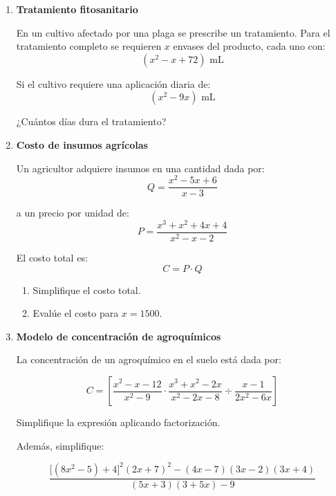 \documentclass[12pt]{article}
\begin{document}
\begin{enumerate}
		Para mejorar el rendimiento de un cultivo se deben fertilizar:
		\[
		(3n^2+5n)
		\]
		plantas y la dosis a aplicar a cada una es de
		\[
		(2n+7)\text{ mL}.
		\]
		
		Determine la cantidad total de fertilizante (en mL) que se debe aplicar.
		
		\item \textbf{Tratamiento fitosanitario}
		
		En un cultivo afectado por una plaga se prescribe un tratamiento. Para el tratamiento completo se requieren \(x\) envases del producto, cada uno con:
		\[
		(x^2-x+72)\text{ mL}
		\]
		
		Si el cultivo requiere una aplicación diaria de:
		\[
		(x^2-9x)\text{ mL}
		\]
		
		¿Cuántos días dura el tratamiento?
		
		\item \textbf{Costo de insumos agrícolas}
		
		Un agricultor adquiere insumos en una cantidad dada por:
		\[
		Q=\frac{x^2-5x+6}{x-3}
		\]
		
		a un precio por unidad de:
		\[
		P=\frac{x^3+x^2+4x+4}{x^2-x-2}
		\]
		
		El costo total es:
		\[
		C=P\cdot Q
		\]
		
		\begin{enumerate}[label=\alph*)]
			\item Simplifique el costo total.
			\item Evalúe el costo para \(x=1500\).
		\end{enumerate}
		
		\item \textbf{Modelo de concentración de agroquímicos}
		
		La concentración de un agroquímico en el suelo está dada por:
		
		\[
		C=\left[
		\frac{x^2-x-12}{x^2-9}
		\cdot
		\frac{x^3+x^2-2x}{x^2-2x-8}
		\div
		\frac{x-1}{2x^2-6x}
		\right]
		\]
		
		Simplifique la expresión aplicando factorización.
		
		\vspace{0.3cm}
		
		Además, simplifique:
		
		\[
		\frac{\bigl[(8x^2-5)+4\bigr]^2(2x+7)^2-(4x-7)(3x-2)(3x+4)}
		{(5x+3)(3+5x)-9}
		\]
		
	\end{enumerate}
	
\end{document}

